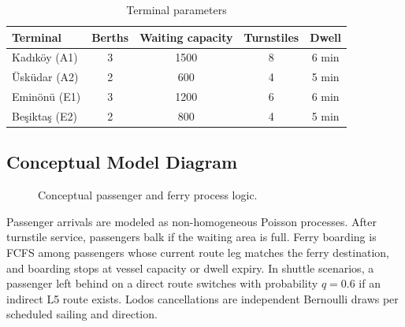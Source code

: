 \documentclass[11pt,a4paper]{article}
\begin{document}
\begin{table}[H]
\centering
\caption{Terminal parameters}
\label{tab:terminals}
\begin{tabular}{lcccc}
\toprule
\textbf{Terminal} & \textbf{Berths} & \textbf{Waiting capacity} & \textbf{Turnstiles} & \textbf{Dwell} \\
\midrule
Kad\i k\"{o}y (A1) & 3 & 1500 & 8 & 6 min \\
\"Usk\"{u}dar (A2) & 2 & 600 & 4 & 5 min \\
Emin\"{o}n\"{u} (E1) & 3 & 1200 & 6 & 6 min \\
Be\c{s}ikta\c{s} (E2) & 2 & 800 & 4 & 5 min \\
\bottomrule
\end{tabular}
\end{table}

\subsection{Conceptual Model Diagram}
\begin{figure}[H]
\centering
\small
{}
\caption{Conceptual passenger and ferry process logic.}
\label{fig:conceptual_model}
\end{figure}

Passenger arrivals are modeled as non-homogeneous Poisson processes. After turnstile service, passengers balk if the waiting area is full. Ferry boarding is FCFS among passengers whose current route leg matches the ferry destination, and boarding stops at vessel capacity or dwell expiry. In shuttle scenarios, a passenger left behind on a direct route switches with probability $q=0.6$ if an indirect L5 route exists. Lodos cancellations are independent Bernoulli draws per scheduled sailing and direction.
\end{document}
